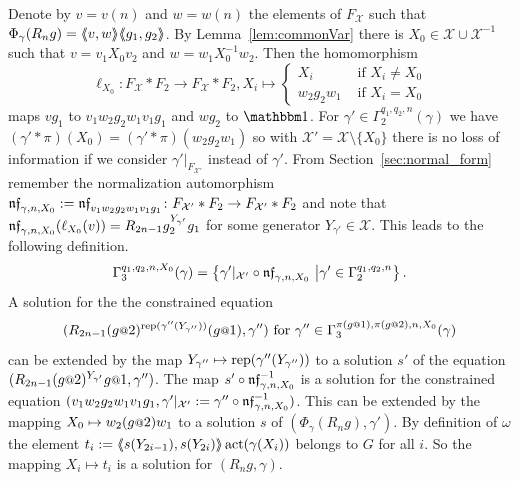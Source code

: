 \documentclass[a4paper,11pt]{amsart}
\begin{document}
Denote by $v=v(n)$ and $w=w(n)$ the elements of $F_{\mathcal X}$ such
that $\Phi_\gamma(R_ng)=\langle\negthickspace\langle v,w\rangle\negthickspace\rangle\langle\negthickspace\langle g_1,g_2\rangle\negthickspace\rangle$.  By
Lemma~\ref{lem:commonVar} there is
$X_0 \in \mathcal{X}\cup \mathcal{X}^{-1}$ such that $v=v_1X_0v_2$ and
$w=w_1X_0^{-1}w_2$. Then the homomorphism
\[\ell_{X_0}\colon F_{\mathcal{X}}*F_2\to F_{\mathcal{X}}*F_2, X_i \mapsto \begin{cases}
    X_i &\text{ if } X_i\neq {X_0} \\
    w_2g_2w_1 &\text{ if }X_i= {X_0} 
  \end{cases}
\]
maps $vg_1$ to $v_1w_2g_2w_1v_1g_1$ and $wg_2$ to $\id$.  For
$\gamma'\in \Gamma_2^{q_1,q_2,n}(\gamma)$ we have
$(\gamma'*\pi)(X_0)=({\gamma'*\pi})(w_2g_2w_1)$ so with
$\mathcal X'=\mathcal X\setminus\{X_0\}$ there is no loss of
information if we consider $\gamma'|_{F_{\mathcal X'}}$ instead of
$\gamma'$.  From Section~\ref{sec:normal_form} remember the
normalization automorphism
$\mathfrak{nf}_{\gamma,n,X_0}:=\mathfrak{nf}_{v_1w_2g_2w_1v_1g_1}\colon F_{\mathcal
  X'}*F_2 \to F_{\mathcal X'}*F_2$ and note that
$\mathfrak{nf}_{\gamma,n,X_0}(\ell_{X_0}(v))=R_{2n-1}g_2^{{Y_{\gamma'}}}g_1$ for
some generator ${Y_{\gamma'}}\in\mathcal{X}$.  This leads to the
following definition.
\[\Gamma_3^{q_1,q_2,n,X_0}(\gamma) = \left\{\gamma'|_{\mathcal X'} \circ \mathfrak{nf}_{\gamma,n,X_0} \ \middle \vert \gamma' \in \Gamma_2^{q_1,q_2,n} \right\}.\] 
A solution for the the constrained equation
\[(R_{2n-1}(g\at2)^{\rep(\gamma''({Y_{\gamma''}}))}(g\at1),\gamma'')\textup{
    for }\gamma'' \in
  \Gamma_3^{\pi(g\at{1}),\pi(g\at{2}),n,X_0}(\gamma)\]
can be extended by the map
${Y_{\gamma''}}\mapsto \operatorname{rep}(\gamma''({Y_{\gamma''}}))$ to a solution
$s'$ of the equation
$(R_{2n-1} (g\at{2})^{{Y_{\gamma'}}} g\at{1},\gamma'')$. The map
$s'\circ \mathfrak{nf}_{\gamma,n,X_0}^{-1}$ is a solution for the constrained
equation
$(v_1w_2g_2w_1v_1g_1,\gamma'|_{\mathcal X'}:=\gamma'' \circ
\mathfrak{nf}_{\gamma,n,X_0}^{-1})$.  This can be extended by the mapping
$X_0\mapsto w_2(g\at{2})w_1$ to a solution $s$ of
$(\Phi_\gamma(R_n g),\gamma')$.  By definition of $\omega$ the element
$t_i:=\langle\negthickspace\langle s(Y_{2i-1}),s(Y_{2i})\rangle\negthickspace\rangle\operatorname{act}(\gamma(X_i))$ belongs to $G$
for all $i$. So the mapping $X_i\mapsto t_i$ is a solution for
$(R_ng,\gamma)$.
 
\end{document}
